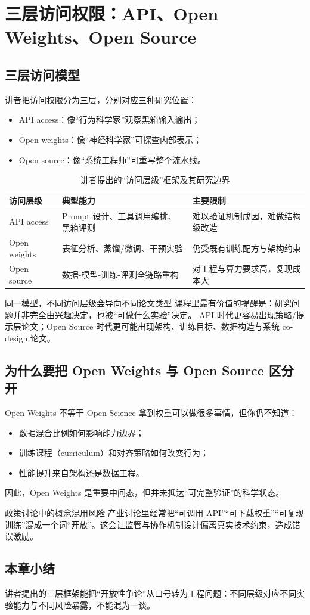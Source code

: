 \section{三层访问权限：API、Open Weights、Open Source}

\subsection{三层访问模型}
讲者把访问权限分为三层，分别对应三种研究位置：
\begin{itemize}
    \item API access：像“行为科学家”观察黑箱输入输出；
    \item Open weights：像“神经科学家”可探查内部表示；
    \item Open source：像“系统工程师”可重写整个流水线。
\end{itemize}

\begin{table}[H]
\centering
\begin{tabular}{p{2.4cm}p{4.2cm}p{4.8cm}}
\toprule
\textbf{访问层级} & \textbf{典型能力} & \textbf{主要限制} \\
\midrule
API access & Prompt 设计、工具调用编排、黑箱评测 & 难以验证机制成因，难做结构级改造 \\
Open weights & 表征分析、蒸馏/微调、干预实验 & 仍受既有训练配方与架构约束 \\
Open source & 数据-模型-训练-评测全链路重构 & 对工程与算力要求高，复现成本大 \\
\bottomrule
\end{tabular}
\caption{讲者提出的“访问层级”框架及其研究边界}
\end{table}

\begin{importantbox}{同一模型，不同访问层级会导向不同论文类型}
课程里最有价值的提醒是：研究问题并非完全由兴趣决定，也被“可做什么实验”决定。  
API 时代更容易出现策略/提示层论文；Open Source 时代更可能出现架构、训练目标、数据构造与系统 co-design 论文。
\end{importantbox}

\subsection{为什么要把 Open Weights 与 Open Source 区分开}
\begin{knowledgebox}{Open Weights 不等于 Open Science}
拿到权重可以做很多事情，但你仍不知道：
\begin{itemize}
    \item 数据混合比例如何影响能力边界；
    \item 训练课程（curriculum）和对齐策略如何改变行为；
    \item 性能提升来自架构还是数据工程。
\end{itemize}
因此，Open Weights 是重要中间态，但并未抵达“可完整验证”的科学状态。
\end{knowledgebox}

\begin{warningbox}{政策讨论中的概念混用风险}
产业讨论里经常把“可调用 API”“可下载权重”“可复现训练”混成一个词“开放”。这会让监管与协作机制设计偏离真实技术约束，造成错误激励。
\end{warningbox}

\subsection{本章小结}
讲者提出的三层框架能把“开放性争论”从口号转为工程问题：不同层级对应不同实验能力与不同风险暴露，不能混为一谈。


